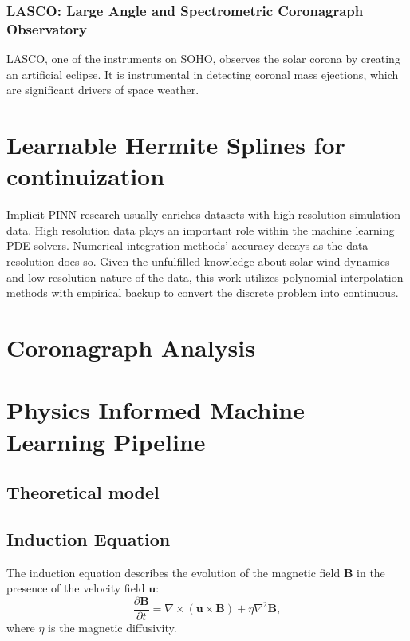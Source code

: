 \documentclass[12pt]{article}
\begin{document}
\subsubsection{LASCO: Large Angle and Spectrometric Coronagraph Observatory}
LASCO, one of the instruments on SOHO, observes the solar corona by creating an artificial eclipse. It is instrumental in detecting coronal mass ejections, which are significant drivers of space weather.

\section{Learnable Hermite Splines for continuization}

Implicit PINN research usually enriches datasets with high resolution simulation data. High resolution data plays an important role within the machine learning PDE solvers. Numerical integration methods' accuracy decays as the data resolution does so.
Given the unfulfilled knowledge about solar wind dynamics and low resolution nature of the data, this work utilizes polynomial interpolation methods with empirical backup \cite{windmodelling1} to convert the discrete problem into continuous.

\section{Coronagraph Analysis}

\section{Physics Informed Machine Learning Pipeline}

\subsection{Theoretical model}


\subsection{Induction Equation}
The induction equation describes the evolution of the magnetic field \( \mathbf{B} \) in the presence of the velocity field \( \mathbf{u} \):
\begin{equation}
\frac{\partial \mathbf{B}}{\partial t} = \nabla \times (\mathbf{u} \times \mathbf{B}) + \eta \nabla^2 \mathbf{B},
\end{equation}
where \( \eta \) is the magnetic diffusivity.
\end{document}
